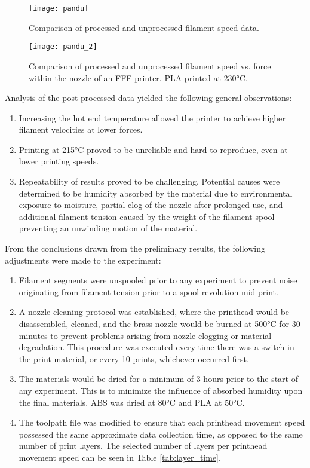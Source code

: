 \documentclass[main.tex]{subfiles}
\begin{document}
\begin{figure}[!htbp]
	\center
	\texttt{[image: pandu]}
	\caption{Comparison of processed and unprocessed filament speed data.} \label{fig:pandu_1}
\end{figure}

\begin{figure}[!htbp]
	\center
	\texttt{[image: pandu\_2]}
	\caption{Comparison of processed and unprocessed filament speed vs. force within the nozzle of an FFF printer. PLA printed at 230°C.} \label{fig:pandu_2}
\end{figure}

\pagebreak

Analysis of the post-processed data yielded the following general observations:
\begin{enumerate}
	\item Increasing the hot end temperature allowed the printer to achieve higher filament velocities at lower forces.
	\item Printing at 215°C proved to be unreliable and hard to reproduce, even at lower printing speeds.
	\item Repeatability of results proved to be challenging. Potential causes were determined to be humidity absorbed by the material due to environmental exposure to moisture, partial clog of the nozzle after prolonged use, and additional filament tension caused by the weight of the filament spool preventing an unwinding motion of the material. 
\end{enumerate}

From the conclusions drawn from the preliminary results, the following adjustments were made to the experiment:

\begin{enumerate}
	\item Filament segments were unspooled prior to any experiment to prevent noise originating from filament tension prior to a spool revolution mid-print.
	\item A nozzle cleaning protocol was established, where the printhead would be disassembled, cleaned, and the brass nozzle would be burned at 500°C for 30 minutes to prevent problems arising from nozzle clogging or material degradation. This procedure was executed every time there was a switch in the print material, or every 10 prints, whichever occurred first.
	\item The materials would be dried for a minimum of 3 hours prior to the start of any experiment. This is to minimize the influence of absorbed humidity upon the final materials. ABS was dried at 80°C and PLA at 50°C.
	\item The toolpath file was modified to ensure that each printhead movement speed possessed the same approximate data collection time, as opposed to the same number of print layers. The selected number of layers per printhead movement speed can be seen in Table \ref{tab:layer_time}.
\end{enumerate}
\end{document}
